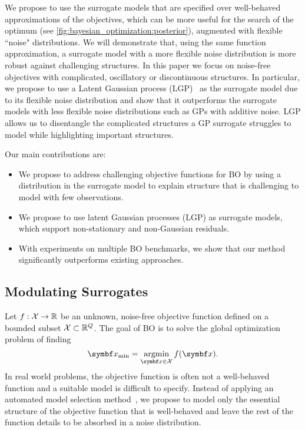 We propose to use the surrogate models that are specified over well-behaved approximations of the objectives,
which can be more useful for the search of the optimum (see \cref{fig:bayesian_optimization:posterior}), augmented with flexible ``noise" distributions.
We will demonstrate that, using the same function approximation, a surrogate model with a more flexible noise distribution is more robust against challenging structures.
In this paper we focus on noise-free objectives with complicated, oscillatory or discontinuous structures.
In particular, we propose to use a Latent Gaussian process (LGP)~\parencite{pfingsten_nonstationary_2006,wang_gaussian_2012,yousefi_unsupervised_2016,bodin_latent_2017} as the surrogate model due to its flexible noise distribution and show that it outperforms the surrogate models with less flexible noise distributions such as GPs with additive noise.
LGP allows us to disentangle the complicated structures a GP surrogate struggles to model while highlighting important structures.

Our main contributions are:
\begin{itemize}
    \item We propose to address challenging objective functions for BO by using a distribution in the surrogate model to explain structure that is challenging to model with few observations.
    \item We propose to use latent Gaussian processes (LGP) as surrogate models, which support non-stationary and non-Gaussian residuals.
    \item With experiments on multiple BO benchmarks, we show that our method significantly outperforms existing approaches.
\end{itemize}

\subsection{Modulating Surrogates}
\label{sub:bayesian_optimization:modulated_objectives}

Let $f : \mathcal{X} \to \mathbb{R}$ be an unknown, noise-free objective function defined on a bounded subset $\mathcal{X} \subset \mathbb{R}^Q$.
The goal of BO is to solve the global optimization problem of finding
\begin{equation}
    \mat{x}_{\text{min}} = \argmin_{\mat{x} \in \Xc} f(\mat{x}).
\end{equation}
In real world problems,
the objective function is often not a well-behaved function and a suitable model is difficult to specify.
Instead of applying an automated model selection method~\parencite{malkomes_automating_2018},
we propose to model only the essential structure of the objective function that is well-behaved and leave the rest of the function details to be absorbed in a noise distribution.

